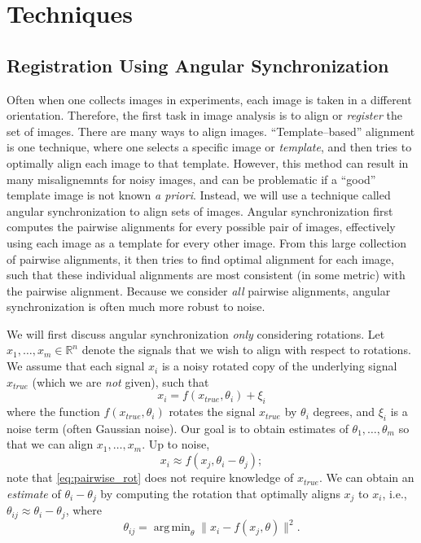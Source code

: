 \documentclass[11pt]{article}
\DeclareMathOperator*{\argmin}{arg\,min}
\begin{document}
\section{Techniques}

\subsection{Registration Using Angular Synchronization} \label{subsec:angsynch}

Often when one collects images in experiments, each image is taken in a different orientation. 
%
Therefore, the first task in image analysis is to align or {\em register} the set of images. 
%
There are many ways to align images. 
%
``Template--based'' alignment \cite{ahuja2007template} is one technique, where one selects a specific image or {\em template}, and then tries to optimally align each image to that template.
%
However, this method can result in many misalignemnts for noisy images, and can be problematic if a ``good'' template image is not known {\em a priori}. 
%
Instead, we will use a technique called angular synchronization\cite{singer2011angular} to align sets of images.
%
Angular synchronization first computes the pairwise alignments for every possible pair of images, effectively using each image as a template for every other image.
%
From this large collection of pairwise alignments, it then tries to find optimal alignment for each image, such that these individual alignments are most consistent (in some metric) with the pairwise alignment.
%
Because we consider {\em all} pairwise alignments, angular synchronization is often much more robust to noise. 

We will first discuss angular synchronization {\em only} considering rotations. 
%
Let $x_1, \dots, x_m \in \mathbb{R}^n$ denote the signals that we wish to align with respect to rotations.
%
We assume that each signal $x_i$ is a noisy rotated copy of the underlying signal $x_{true}$ (which we are {\em not} given), such that 
\begin{equation}
x_i = f(x_{true}, \theta_i) + \xi_i
\end{equation}
where the function $f(x_{true}, \theta_i)$ rotates the signal $x_{true}$ by $\theta_i$ degrees, and $\xi_i$ is a noise term (often Gaussian noise). 
%
Our goal is to obtain estimates of $\theta_1, \dots, \theta_m$ so that we can align $x_1, \dots, x_m$. 
%
Up to noise, 
\begin{equation} \label{eq:pairwise_rot}
x_i \approx f(x_j, \theta_i - \theta_j) ;
\end{equation}
 note that \eqref{eq:pairwise_rot} does not require knowledge of $x_{true}$.
%
We can obtain an {\em estimate} of $\theta_i - \theta_j$ by computing the rotation that optimally aligns $x_j$ to $x_i$, 
i.e., $\theta_{ij} \approx \theta_i - \theta_j$, where
%
\begin{equation} \label{eq:opt_angle}
\theta_{ij} = \argmin_{\theta} \|x_i - f(x_j, \theta)\|^2.
\end{equation}
\end{document}
